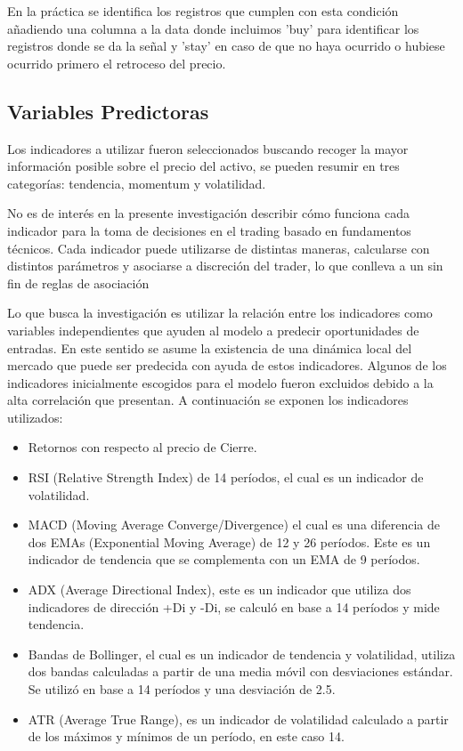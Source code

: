\documentclass[a4paper,12pt]{Latex/Classes/PhDthesisPSnPDF}
\begin{document}
En la práctica se identifica los registros que cumplen con esta condición añadiendo una columna a la data donde incluimos 'buy' para identificar los registros donde se da la señal y 'stay' en caso de que no haya ocurrido o hubiese ocurrido primero el retroceso del precio.

\subsection{Variables Predictoras}

Los indicadores a utilizar fueron seleccionados buscando recoger la mayor información posible sobre el precio del activo, se pueden resumir en tres categorías: tendencia, momentum y volatilidad.

No es de interés en la presente investigación describir cómo funciona cada indicador para la toma de decisiones en el trading basado en fundamentos técnicos. Cada indicador puede utilizarse de distintas maneras, calcularse con distintos parámetros y asociarse a discreción del trader, lo que conlleva a un sin fin de reglas de asociación 

Lo que busca la investigación es utilizar la relación entre los indicadores como variables independientes que ayuden al modelo a predecir oportunidades de entradas. En este sentido se asume la existencia de una dinámica local del mercado que puede ser predecida con ayuda de estos indicadores. Algunos de los indicadores inicialmente escogidos para el modelo fueron excluidos debido a la alta correlación que presentan. A continuación se exponen los indicadores utilizados:

\begin{itemize}
\item Retornos con respecto al precio de Cierre.
\item RSI (Relative Strength Index) de 14 períodos, el cual es un indicador de volatilidad.
\item MACD (Moving Average Converge/Divergence) el cual es una diferencia de dos EMAs (Exponential Moving Average) de 12 y 26 períodos. Este es un indicador de tendencia que se complementa con un EMA de 9 períodos. 
\item ADX (Average Directional Index), este es un indicador que utiliza dos indicadores de dirección +Di y -Di, se calculó en base a 14 períodos y mide tendencia.
\item Bandas de Bollinger, el cual es un indicador de tendencia y volatilidad, utiliza dos bandas calculadas a partir de una media móvil con desviaciones estándar. Se utilizó en base a 14 períodos y una desviación de 2.5.
\item ATR (Average True Range), es un indicador de volatilidad calculado a partir de los máximos y mínimos de un período, en este caso 14.
\end{itemize}
\end{document}
